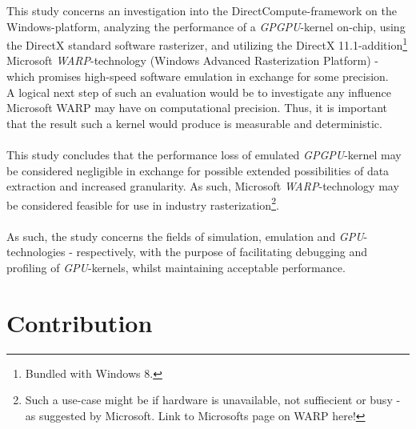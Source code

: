 \documentclass[fleqn,10pt]{SelfArx} %
\begin{document}
This study concerns an investigation into the DirectCompute-framework on the Windows-platform, analyzing the performance of a \textit{GPGPU}-kernel on-chip, using the DirectX standard software rasterizer, and utilizing the DirectX 11.1-addition\footnote{Bundled with Windows 8.} Microsoft \textit{WARP}-technology (Windows Advanced Rasterization Platform) - which promises high-speed software emulation in exchange for some precision. \\
A logical next step of such an evaluation would be to investigate any influence Microsoft WARP may have on computational precision. Thus, it is important that the result such a kernel would produce is measurable and deterministic. \\
\\
This study concludes that the performance loss of emulated \textit{GPGPU}-kernel may be considered negligible in exchange for possible extended possibilities of data extraction and increased granularity. As such, Microsoft \textit{WARP}-technology may be considered feasible for use in industry rasterization\footnote{Such a use-case might be if hardware is unavailable, not suffiecient or busy - as suggested by Microsoft. Link to Microsofts page on WARP here!}.\\
\\
As such, the study concerns the fields of simulation, emulation and \textit{GPU}-technologies - respectively, with the purpose of facilitating debugging and profiling of \textit{GPU}-kernels, whilst maintaining acceptable performance.

\section{Contribution}
\label{sec:contribution}

\end{document}
